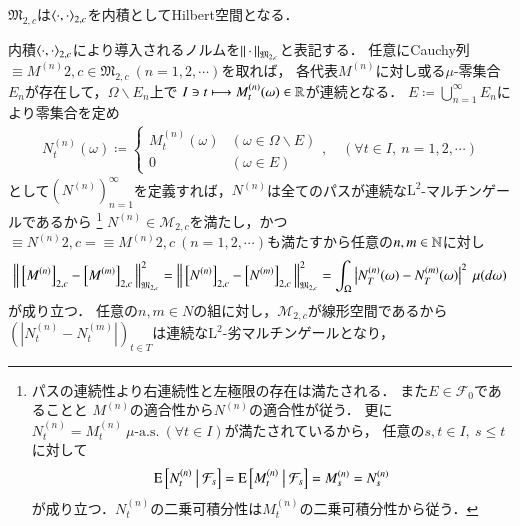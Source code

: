 	\begin{screen}
		\begin{prp}
			$\mathfrak{M}_{2,c}$は$\inprod<\cdot,\cdot>_{2,c}$を内積としてHilbert空間となる．
		\end{prp}
	\end{screen}
			
	\begin{prf}
			内積$\inprod<\cdot,\cdot>_{2,c}$により導入されるノルムを$\left\|\, \cdot\, \right\|_{\mathfrak{M}_{2,c}}$と表記する．
			任意にCauchy列$\equiv{M^{(n)}}{2,c} \in \mathfrak{M}_{2,c}\ (n=1,2,\cdots)$を取れば，
			各代表$M^{(n)}$に対し或る$\mu$-零集合$E_n$が存在して，$\Omega \backslash E_n$上で
			$I \ni t \longmapsto M^{(n)}_t(\omega) \in \mathbb{R}$が連続となる．
			$E \coloneqq \bigcup_{n=1}^{\infty} E_n$により零集合を定め
			\begin{align}
				N^{(n)}_t(\omega) \coloneqq
				\begin{cases}
					M^{(n)}_t(\omega) & (\omega \in \Omega \backslash E) \\
					0 & (\omega \in E)
				\end{cases}
				,\quad (\forall t \in I,\ n = 1,2,\cdots)
			\end{align}
		として$\left( N^{(n)} \right)_{n=1}^{\infty}$を定義すれば，$N^{(n)}$は全てのパスが連続な$\mathrm{L}^2$-マルチンゲールであるから
		\footnote{
			パスの連続性より右連続性と左極限の存在は満たされる．
			また$E \in \mathcal{F}_0$であることと
			$M^{(n)}$の適合性から$N^{(n)}$の適合性が従う．
			更に$N^{(n)}_t = M^{(n)}_t\ \mbox{$\mu$-a.s.}\ (\forall t \in I)$が満たされているから，
			任意の$s,t \in I,\ s \leq t$に対して
			\begin{align}
				\operatorname{E} \left[ N^{(n)}_t \ \middle|\ \mathcal{F}_s \right] = \operatorname{E} \left[ M^{(n)}_t \ \middle|\ \mathcal{F}_s \right] = M^{(n)}_s = N^{(n)}_s
			\end{align}
			が成り立つ．$N^{(n)}_t$の二乗可積分性は$M^{(n)}_t$の二乗可積分性から従う．
		}
		$N^{(n)} \in \mathcal{M}_{2,c}$を満たし，かつ
		$\equiv{N^{(n)}}{2,c} = \equiv{M^{(n)}}{2,c}\ (n=1,2,\cdots)$も満たすから任意の$n,m \in \mathbb{N}$に対し
		\begin{align}
			\left\|\, \left[M^{(n)}\right]_{2,c} - \left[M^{(m)}\right]_{2,c}\, \right\|_{\mathfrak{M}_{2,c}}^2 
			= \left\|\, \left[N^{(n)}\right]_{2,c} - \left[N^{(m)}\right]_{2,c}\, \right\|_{\mathfrak{M}_{2,c}}^2
			= \int_{\Omega} \left| N^{(n)}_T(\omega) - N^{(m)}_T(\omega) \right|^2\ \mu(d\omega)
		\end{align}
		が成り立つ．
		任意の$n,m \in N$の組に対し，$\mathcal{M}_{2,c}$が線形空間であるから
		$\left(\left|N^{(n)}_t - N^{(m)}_t\right|\right)_{t \in T}$は連続な$\mathrm{L}^2$-劣マルチンゲールとなり，

\end{prf}
